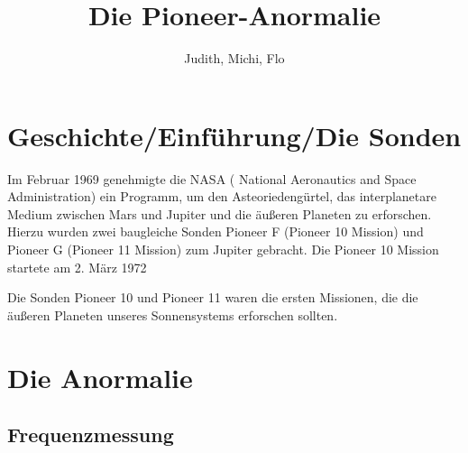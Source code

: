 \documentclass[a4paper,10pt]{article}
\title{Die Pioneer-Anormalie}
\author{Judith, Michi, Flo}
\begin{document}
\maketitle

% 

\section{Geschichte/Einführung/Die Sonden}
Im Februar 1969 genehmigte die NASA ( National Aeronautics and Space Administration) ein Programm, um den Asteoriedengürtel,
das interplanetare Medium zwischen Mars und Jupiter und die äußeren Planeten zu erforschen.
Hierzu wurden zwei baugleiche Sonden Pioneer F (Pioneer 10 Mission) und Pioneer G (Pioneer 11 Mission) zum Jupiter gebracht.
Die Pioneer 10 Mission startete am 2. März 1972

Die Sonden Pioneer 10 und Pioneer 11 waren die ersten Missionen, die die äußeren Planeten unseres Sonnensystems erforschen sollten. 


\section{Die Anormalie}
\subsection{Frequenzmessung}
\end{document}
